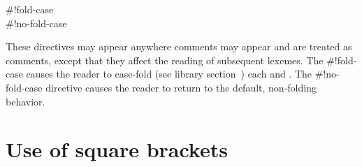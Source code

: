 \documentclass[twoside,twocolumn]{algol60}
\begin{document}
\begin{entry}{%
{\cf{}\#!fold-case}\\
{\cf{}\#!no-fold-case}}

These directives may appear anywhere comments may appear and are
treated as comments, except that they affect the reading of subsequent
lexemes.
The {\cf{}\#!fold-case} causes the reader to case-fold
(see library section~)
each  and .
The {\cf{}\#!no-fold-case} directive causes the reader to return
to the default, non-folding behavior.
\end{entry}

\chapter{Use of square brackets}
\end{document}
